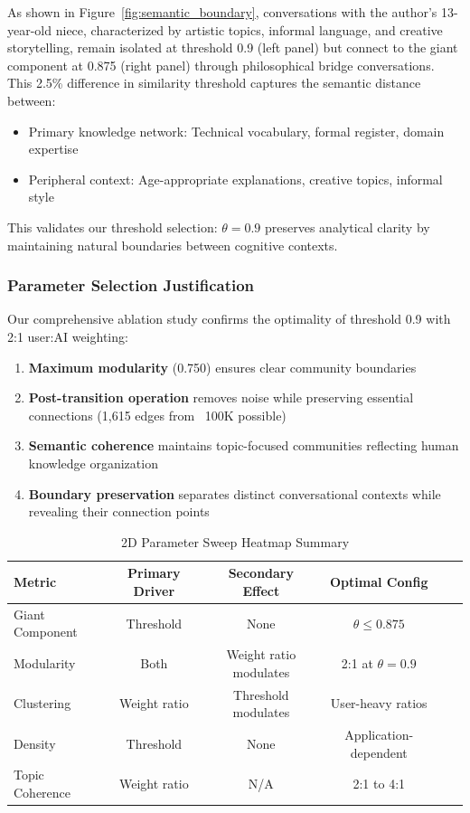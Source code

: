 \documentclass{svproc}
\begin{document}
As shown in Figure~\ref{fig:semantic_boundary}, conversations with the author's 13-year-old niece, characterized by artistic topics, informal language, and creative storytelling, remain isolated at threshold 0.9 (left panel) but connect to the giant component at 0.875 (right panel) through philosophical bridge conversations. This 2.5\% difference in similarity threshold captures the semantic distance between:

\begin{itemize}
    \item Primary knowledge network: Technical vocabulary, formal register, domain expertise
    \item Peripheral context: Age-appropriate explanations, creative topics, informal style
\end{itemize}

This validates our threshold selection: $\theta=0.9$ preserves analytical clarity by maintaining natural boundaries between cognitive contexts.

\subsubsection{Parameter Selection Justification}

Our comprehensive ablation study confirms the optimality of threshold 0.9 with 2:1 user:AI weighting:

\begin{enumerate}
    \item \textbf{Maximum modularity} (0.750) ensures clear community boundaries
    \item \textbf{Post-transition operation} removes noise while preserving essential connections (1,615 edges from ~100K possible)
    \item \textbf{Semantic coherence} maintains topic-focused communities reflecting human knowledge organization
    \item \textbf{Boundary preservation} separates distinct conversational contexts while revealing their connection points
\end{enumerate}

\begin{table}[h]
\centering
\caption{2D Parameter Sweep Heatmap Summary}
\label{tab:2d_summary}
\begin{tabular}{lccccc}
\toprule
\textbf{Metric} & \textbf{Primary Driver} & \textbf{Secondary Effect} & \textbf{Optimal Config} \\
\midrule
Giant Component & Threshold & None & $\theta \leq 0.875$ \\
Modularity & Both & Weight ratio modulates & 2:1 at $\theta=0.9$ \\
Clustering & Weight ratio & Threshold modulates & User-heavy ratios \\
Density & Threshold & None & Application-dependent \\
Topic Coherence & Weight ratio & N/A & 2:1 to 4:1 \\
\bottomrule
\end{tabular}
\end{table}
\end{document}
